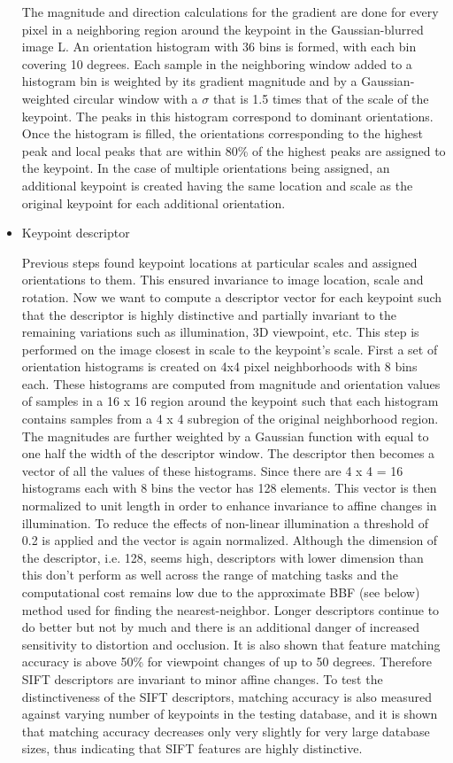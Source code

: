 \documentclass[12pt]{article}
\begin{document}
\begin{itemize}
The magnitude and direction calculations for the gradient are done for every pixel in a neighboring region around the keypoint in the Gaussian-blurred image L. An orientation histogram with 36 bins is formed, with each bin covering 10 degrees. Each sample in the neighboring window added to a histogram bin is weighted by its gradient magnitude and by a Gaussian-weighted circular window with a $\sigma$ that is 1.5 times that of the scale of the keypoint. The peaks in this histogram correspond to dominant orientations. Once the histogram is filled, the orientations corresponding to the highest peak and local peaks that are within 80\% of the highest peaks are assigned to the keypoint. In the case of multiple orientations being assigned, an additional keypoint is created having the same location and scale as the original keypoint for each additional orientation.

	\item Keypoint descriptor

Previous steps found keypoint locations at particular scales and assigned orientations to them. This ensured invariance to image location, scale and rotation. Now we want to compute a descriptor vector for each keypoint such that the descriptor is highly distinctive and partially invariant to the remaining variations such as illumination, 3D viewpoint, etc. This step is performed on the image closest in scale to the keypoint's scale.
First a set of orientation histograms is created on 4x4 pixel neighborhoods with 8 bins each. These histograms are computed from magnitude and orientation values of samples in a 16 x 16 region around the keypoint such that each histogram contains samples from a 4 x 4 subregion of the original neighborhood region. The magnitudes are further weighted by a Gaussian function with   equal to one half the width of the descriptor window. The descriptor then becomes a vector of all the values of these histograms. Since there are 4 x 4 = 16 histograms each with 8 bins the vector has 128 elements. This vector is then normalized to unit length in order to enhance invariance to affine changes in illumination. To reduce the effects of non-linear illumination a threshold of 0.2 is applied and the vector is again normalized.
Although the dimension of the descriptor, i.e. 128, seems high, descriptors with lower dimension than this don't perform as well across the range of matching tasks and the computational cost remains low due to the approximate BBF (see below) method used for finding the nearest-neighbor. Longer descriptors continue to do better but not by much and there is an additional danger of increased sensitivity to distortion and occlusion. It is also shown that feature matching accuracy is above 50\% for viewpoint changes of up to 50 degrees. Therefore SIFT descriptors are invariant to minor affine changes. To test the distinctiveness of the SIFT descriptors, matching accuracy is also measured against varying number of keypoints in the testing database, and it is shown that matching accuracy decreases only very slightly for very large database sizes, thus indicating that SIFT features are highly distinctive.
	
\end{itemize}
\end{document}
